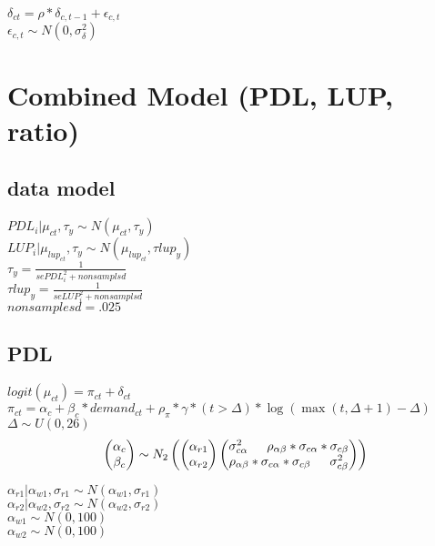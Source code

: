 \documentclass[12pt]{article}
\begin{document}
\noindent
 $ \delta_{ct} = \rho*\delta_{c,t-1}+\epsilon_{c,t} $ \\
 $ \epsilon_{c,t} \sim N(0,\sigma^2_\delta) $ \\ 
\newpage
\section{Combined Model (PDL, LUP, ratio)}
\subsection{data model}
 $ PDL_i|\mu_{ct},\tau_y \sim N(\mu_{ct}, \tau_y) $ \\
 $ LUP_i|\mu_{lup_{ct}},\tau_y \sim N(\mu_{lup_{ct}}, \tau lup_y) $ \\
 $ \tau_y = \frac{1}{sePDL^2_i + nonsamplsd} $ \\
 $ \tau lup_y = \frac{1}{seLUP^2_i + nonsamplsd} $ \\
 $ nonsamplesd = .025 $ \\
\subsection{PDL}
 $ logit(\mu_{ct})=  \pi_{ct} + \delta_{ct} $\\
 $ \pi_{ct} = \alpha_c + \beta_c*demand_{ct} + \rho_{\pi}*\gamma*(t > \Delta)* \log(\max(t, \Delta+1)-\Delta)$ \\
 $ \Delta \sim U(0,26) $ \\
\begin{equation*}
  \begin{pmatrix}
  	\alpha_c \\
  	\beta_c 
  \end{pmatrix}
  \sim N_2
  \begin{pmatrix}
  	\begin{pmatrix}
    	\alpha_{r1} \\
    	\alpha_{r2}
  	\end{pmatrix}
  	\begin{pmatrix}
    	\sigma^2_{c\alpha}  $\indent$  \rho_{\alpha\beta}*\sigma_{c\alpha}*\sigma_{c\beta} \\
    	\rho_{\alpha\beta}*\sigma_{c\alpha}*\sigma_{c\beta} $\indent$ \sigma^2_{c\beta}
  	\end{pmatrix} 
  \end{pmatrix} \\
\end{equation*}

\noindent
 $ \alpha_{r1}|\alpha_{w1},\sigma_{r1} \sim N(\alpha_{w1},\sigma_{r1}) $ \\
 $ \alpha_{r2}|\alpha_{w2},\sigma_{r2} \sim N(\alpha_{w2},\sigma_{r2}) $ \\
 $ \alpha_{w1} \sim N(0,100) $ \\
 $ \alpha_{w2} \sim N(0,100) $ \\
\end{document}
